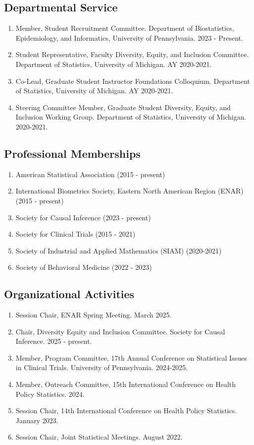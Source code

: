 \documentclass[letterpaper,11pt]{article} %
\begin{document}
	\subsection*{Departmental Service}
    \begin{enumerate}
        \item Member, Student Recruitment Committee. Department of Biostatistics, Epidemiology, and Informatics, University of Pennsylvania. 2023 - Present.
        \item Student Representative, Faculty Diversity, Equity, and Inclusion Committee. Department of Statistics, University of Michigan. AY 2020-2021.
	    \item Co-Lead, Graduate Student Instructor Foundations Colloquium. Department of Statistics, University of Michigan. AY 2020-2021.
	    \item Steering Committee Member, Graduate Student Diversity, Equity, and Inclusion Working Group. Department of Statistics, University of Michigan. 2020-2021.
	\end{enumerate}

	\subsection*{Professional Memberships}
	\begin{enumerate}[noitemsep, leftmargin = 1.25em]
		\item[] American Statistical Association (2015 - present)
		\item[] International Biometrics Society, Eastern North American Region (ENAR) (2015 - present)
        \item[] Society for Causal Inference (2023 - present)
		\item[] Society for Clinical Trials (2015 - 2021)
		\item[] Society of Industrial and Applied Mathematics (SIAM) (2020-2021)
		\item[] Society of Behavioral Medicine (2022 - 2023)
	\end{enumerate}

    \subsection*{Organizational Activities}
    \begin{enumerate}
        \item Session Chair, ENAR Spring Meeting. March 2025.
        \item Chair, Diversity Equity and Inclusion Committee. Society for Causal Inference. 2025 - present.
        \item Member, Program Committee, 17th Annual Conference on Statistical Issues in Clinical Trials. University of Pennsylvania. 2024-2025.
        \item Member, Outreach Committee, 15th International Conference on Health Policy Statistics. 2024.
        \item Session Chair, 14th International Conference on Health Policy Statistics. January 2023.
        \item Session Chair, Joint Statistical Meetings. August 2022.
    \end{enumerate}
\end{document}
